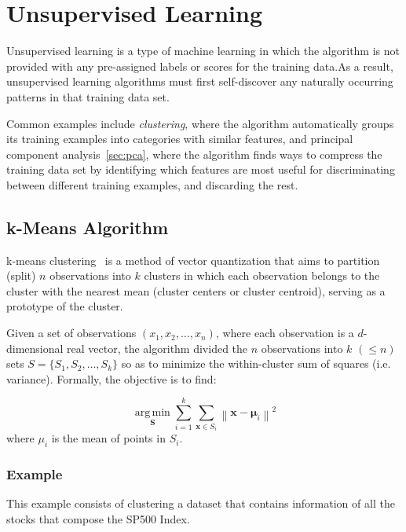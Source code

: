 \section{Unsupervised Learning}
    
Unsupervised learning is a type of machine learning in which the algorithm is not provided with any pre-assigned labels or scores for the training data.As a result, unsupervised learning algorithms must first self-discover any naturally occurring patterns in that training data set. 
    
Common examples include \emph{clustering}, where the algorithm automatically groups its training examples into categories with similar features, and principal component analysis~\ref{sec:pca}, where the algorithm finds ways to compress the training data set by identifying which features are most useful for discriminating between different training examples, and discarding the rest. 
    
\subsection{k-Means Algorithm}
    
k-means clustering~\cite{bib:k-means} is a method of vector quantization that aims to partition (split) $n$ observations into $k$ clusters in which each observation belongs to the cluster with the nearest mean (cluster centers or cluster centroid), serving as a prototype of the cluster. 
    
Given a set of observations $(x_1, x_2, \ldots, x_n)$, where each observation is a $d$-dimensional real vector, the algorithm divided the $n$ observations into $k$ $(\leq n)$ sets $S = \{S_1, S_2, \ldots, S_k\}$ so as to minimize the within-cluster sum of squares (i.e. variance). Formally, the objective is to find:
    
\begin{equation}
\underset {\mathbf {S}}{\operatorname {arg\,min} } \sum _{i=1}^{k}\sum _{\mathbf {x} \in S_{i}}\left\|\mathbf {x} -{\boldsymbol {\mu }}_{i}\right\|^{2}
\end{equation}
where $μ_i$ is the mean of points in $S_i$. 
    
\subsubsection{Example}
This example consists of clustering a dataset that contains information of all the stocks that compose the SP500 Index. 
    
